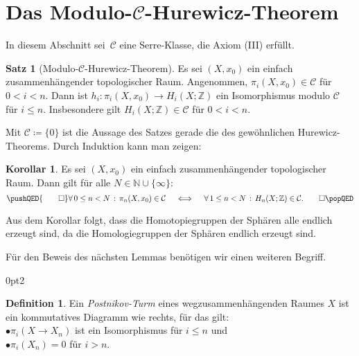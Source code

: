\documentclass[11pt, a4paper, german]{article}
\theoremstyle{definition}
\newtheorem{satz}[lem]{Satz}
\newtheorem{defn}[lem]{Definition}
\newtheorem{kor}[lem]{Korollar}
\theoremstyle{remark}
\newcommand{\N}{\mathbb{N}} %
\newcommand{\Z}{\mathbb{Z}} %
\newcommand{\fa}[1]{\forall \, {#1} \,:\,}
\newcommand{\SC}{\mathcal{C}} %
\newenvironment{centertikzcd}
  {\begin{center}\begin{tikzcd}}
  {\end{tikzcd}\end{center}}
\begin{document}
\section{Das Modulo-$\SC$-Hurewicz-Theorem}

In diesem Abschnitt sei~$\SC$ eine Serre-Klasse, die Axiom (III) erfüllt.

\begin{satz}[Modulo-$\SC$-Hurewicz-Theorem]\label{hurewicz-mod-c}
  Es sei $(X, x_0)$ ein einfach zusammenhängender topologischer Raum.
  Angenommen, $\pi_i(X, x_0) \in \SC$ für $0 < i < n$.
  Dann ist $h_i : \pi_i(X, x_0) \to H_i(X; \Z)$ ein Isomorphismus modulo $\SC$ für $i \leq n$.
  Insbesondere gilt $H_i(X; \Z) \in \SC$ für $0 < i < n$.
\end{satz}

Mit $\SC \coloneqq \{ 0 \}$ ist die Aussage des Satzes gerade die des gewöhnlichen Hurewicz-Theorems.
Durch Induktion kann man zeigen:

\begin{kor}\label{homotopy-in-c-iff-homology-in-c}
  Es sei $(X, x_0)$ ein einfach zusammenhängender topologischer Raum.
  Dann gilt für alle $N \in \N \cup \{ \infty \}$:
  \[
    \pushQED{\qed} 
    \fa{0 \leq n < N} \pi_n(X, x_0) \in \SC
    \quad \iff \quad
    \fa{1 \leq n < N} H_n(X; \Z) \in \SC.
    \qedhere
    \popQED
  \]
\end{kor}

Aus dem Korollar folgt, dass die Homotopiegruppen der Sphären alle endlich erzeugt sind, da die Homologiegruppen der Sphären endlich erzeugt sind.

Für den Beweis des nächsten Lemmas benötigen wir einen weiteren Begriff.

\renewcommand\windowpagestuff{
  \vspace{1cm}
  \begin{centertikzcd}[ampersand replacement=\&, column sep=0.2cm, row sep=0.5cm]
    \&\&\& X \arrow[dll] \arrow[dl] \arrow[d] \\
    \dots \arrow[r] \&
    X_3 \arrow[r] \&
    X_2 \arrow[r] \&
    X_1
  \end{centertikzcd}
}
\opencutright
\begin{cutout}{0}{\dimexpr\linewidth-4.5cm\relax}{0pt}{2}
  \begin{defn}
    Ein \emph{Postnikov-Turm} eines wegzusammenhängenden Raumes $X$ ist ein kommutatives Diagramm wie rechts, für das gilt: \\[3pt]
    \quad$\bullet$\enspace $\pi_i(X \to X_n)$ ist ein Isomorphismus für $i \leq n$ und \\
    \quad$\bullet$\enspace $\pi_i(X_n) = 0$ für $i > n$.
  \end{defn}
\end{cutout}
\end{document}
